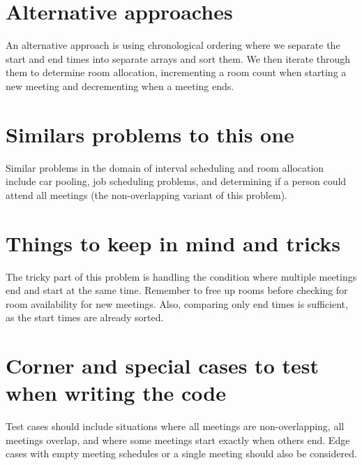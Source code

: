 \section*{Alternative approaches}
An alternative approach is using chronological ordering where we separate the start and end times into separate arrays and sort them. We then iterate through them to determine room allocation, incrementing a room count when starting a new meeting and decrementing when a meeting ends.

\section*{Similars problems to this one}
Similar problems in the domain of interval scheduling and room allocation include car pooling, job scheduling problems, and determining if a person could attend all meetings (the non-overlapping variant of this problem).

\section*{Things to keep in mind and tricks}
The tricky part of this problem is handling the condition where multiple meetings end and start at the same time. Remember to free up rooms before checking for room availability for new meetings. Also, comparing only end times is sufficient, as the start times are already sorted.

\section*{Corner and special cases to test when writing the code}
Test cases should include situations where all meetings are non-overlapping, all meetings overlap, and where some meetings start exactly when others end. Edge cases with empty meeting schedules or a single meeting should also be considered.